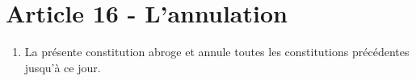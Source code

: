 \section{Article 16 - L'annulation}
\label{article-16-l-annulation}

\begin{enumerate}
 \item
  La présente constitution abroge et annule toutes les constitutions précédentes jusqu'à ce jour.
\end{enumerate}
